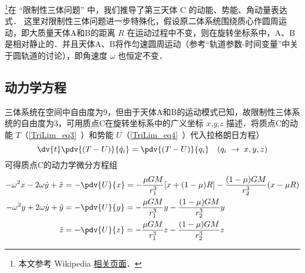 
\begin{issues}
\issueNeedCite
\end{issues}


\footnote{本文参考 Wikipedia \href{https://en.wikipedia.org/wiki/Jacobi_integral}{相关页面}．}在 “限制性三体问题” 中，我们推导了第三天体 C 的动能、势能、角动量表达式． 这里对限制性三体问题进一步特殊化，假设原二体系统围绕质心作圆周运动，即大质量天体A和B的距离 $R$ 在运动过程中不变，则在旋转坐标系中，A、B是相对静止的．并且天体A、B将作匀速圆周运动（参考“轨道参数-时间变量”中关于圆轨道的讨论），即角速度 $\omega$ 也恒定不变．


\subsection{动力学方程}
三体系统在空间中自由度为9，但由于天体A和B的运动模式已知，故限制性三体系统的自由度为3，可用质点C在旋转坐标系中的广义坐标 $x$,$y$,$z$ 描述．将质点C的动能 $T$（\autoref{TriLim_eq3}~）和势能 $U$（\autoref{TriLim_eq4}~）代入拉格朗日方程）
\begin{equation}%
\dv{t} \pdv{(T-U)}{\dot q_i} = \pdv{(T-U)}{q_i}
\quad (q_i\; \rightarrow \; x,y,z)
\end{equation}
可得质点C的动力学微分方程组
\begin{align}
-\omega^2 x - 2\omega\dot{y} + \ddot{x} &=- \pdv{U}{x}=-\frac{\mu GM}{r_1^3}[x+(1-\mu)R]-\frac{(1-\mu)GM}{r_2^3}(x-\mu R)\label{JConst_eq2}\\%
-\omega^2 y +2\omega\dot{y} + \ddot{y} &=- \pdv{U}{y}=-\frac{\mu GM}{r_1^3}y-\frac{(1-\mu)GM}{r_2^3}y\label{JConst_eq3}\\%
\ddot{z} &=- \pdv{U}{z} =-\frac{\mu GM}{r_1^3}z-\frac{(1-\mu)GM}{r_2^3}z\label{JConst_eq4}%
\end{align}

